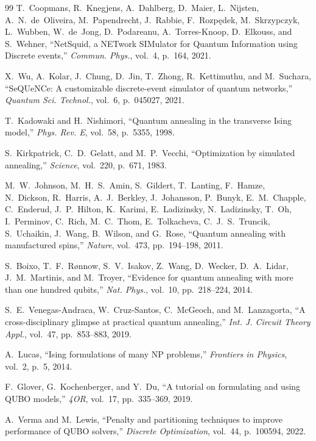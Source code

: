 \documentclass[twocolumn]{article}
\begin{document}
\begin{thebibliography}{99}
T.~Coopmans, R.~Knegjens, A.~Dahlberg, D.~Maier, L.~Nijsten,
A.~N.~de~Oliveira, M.~Papendrecht, J.~Rabbie, F.~Rozp\k{e}dek,
M.~Skrzypczyk, L.~Wubben, W.~de~Jong, D.~Podareanu,
A.~Torres-Knoop, D.~Elkouss, and S.~Wehner,
``NetSquid, a NETwork SIMulator for Quantum Information using Discrete
events,''
\emph{Commun. Phys.}, vol.~4, p.~164, 2021.

X.~Wu, A.~Kolar, J.~Chung, D.~Jin, T.~Zhong, R.~Kettimuthu, and
M.~Suchara, ``SeQUeNCe: A customizable discrete-event simulator of
quantum networks,''
\emph{Quantum Sci. Technol.}, vol.~6, p.~045027, 2021.

T.~Kadowaki and H.~Nishimori,
``Quantum annealing in the transverse Ising model,''
\emph{Phys. Rev. E}, vol.~58, p.~5355, 1998.

S.~Kirkpatrick, C.~D.~Gelatt, and M.~P.~Vecchi,
``Optimization by simulated annealing,''
\emph{Science}, vol.~220, p.~671, 1983.

M.~W.~Johnson, M.~H.~S.~Amin, S.~Gildert, T.~Lanting, F.~Hamze,
N.~Dickson, R.~Harris, A.~J.~Berkley, J.~Johansson, P.~Bunyk,
E.~M.~Chapple, C.~Enderud, J.~P.~Hilton, K.~Karimi, E.~Ladizinsky,
N.~Ladizinsky, T.~Oh, I.~Perminov, C.~Rich, M.~C.~Thom, E.~Tolkacheva,
C.~J.~S.~Truncik, S.~Uchaikin, J.~Wang, B.~Wilson, and G.~Rose,
``Quantum annealing with manufactured spins,''
\emph{Nature}, vol.~473, pp.~194--198, 2011.

S.~Boixo, T.~F.~R{\o}nnow, S.~V.~Isakov, Z.~Wang, D.~Wecker,
D.~A.~Lidar, J.~M.~Martinis, and M.~Troyer,
``Evidence for quantum annealing with more than one hundred qubits,''
\emph{Nat. Phys.}, vol.~10, pp.~218--224, 2014.

S.~E.~Venegas-Andraca, W.~Cruz-Santos, C.~McGeoch, and
M.~Lanzagorta, ``A cross-disciplinary glimpse at practical quantum
annealing,''
\emph{Int. J. Circuit Theory Appl.}, vol.~47, pp.~853--883, 2019.

A.~Lucas, ``Ising formulations of many NP problems,''
\emph{Frontiers in Physics}, vol.~2, p.~5, 2014.

F.~Glover, G.~Kochenberger, and Y.~Du,
``A tutorial on formulating and using QUBO models,''
\emph{4OR}, vol.~17, pp.~335--369, 2019.

A.~Verma and M.~Lewis,
``Penalty and partitioning techniques to improve performance of QUBO
solvers,''
\emph{Discrete Optimization}, vol.~44, p.~100594, 2022.


\end{thebibliography}
\end{document}
